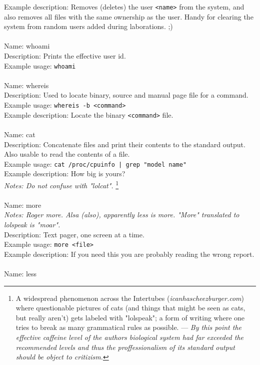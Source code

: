 \documentclass[a4paper,10pt]{article}
\begin{document}
Example description: Removes (deletes) the user \verb!<name>! from the system, and also removes all files with the same ownership as the user. Handy for clearing the system from random users added during laborations. ;)
\\
\\
Name: whoami 
\\
Description: Prints the effective user id.
\\
Example usage: \verb!whoami!
\\
\\
Name: whereis 
\\
Description: Used to locate binary, source and manual page file for a command.
\\
Example usage: \verb!whereis -b <command>!
\\
Example description: Locate the binary \verb!<command>! file.
\\
\\
Name: cat
\\
Description: Concatenate files and print their contents to the standard output. Also usable to read the contents of a file.
\\
Example usage: \verb!cat /proc/cpuinfo | grep "model name"!
\\
Example description: How big is yours?
\\
\textit{Notes: Do not confuse with "lolcat".} \footnote{A widespread phenomenon across the Intertubes (\textit{icanhascheezburger.com}) where questionable pictures of cats (and things that might be seen as cats, but really aren't) gets labeled with "lolspeak"; a form of writing where one tries to break as many grammatical rules as possible. --- \textit{By this point the effective caffeine level of the authors biological system had far exceeded the recommended levels and thus the proffessionalism of its standard output should be object to critizism.}}
\\
\\
Name: more
\\
\textit{Notes: Roger more. Alsa (also), apparently less is more. "More" translated to lolspeak is "moar".}
\\
Description: Text pager, one screen at a time.
\\
Example usage: \verb!more <file>!
\\
Example description: If you need this you are probably reading the wrong report.
\\
\\
Name: less
\\
\end{document}
